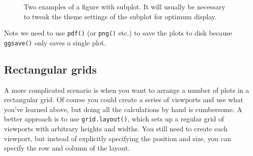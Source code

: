\begin{figure}[htbp]
  \centering
  \caption{Two examples of a figure with subplot. It will usually be necessary to tweak the theme settings of the subplot for optimum display.}
  \label{fig:subplot}
\end{figure}

Note we need to use \texttt{pdf()} (or \texttt{png()} etc.) to save the
plots to disk because \texttt{ggsave()} only saves a single plot.

\subsection{Rectangular grids}

A more complicated scenario is when you want to arrange a number of
plots in a rectangular grid. Of course you could create a series of
viewports and use what you've learned above, but doing all the
calculations by hand is cumbersome. A better approach is to use
\texttt{grid.layout()}, which sets up a regular grid of viewports with
arbitrary heights and widths. You still need to create each viewport,
but instead of explicitly specifying the position and size, you can
specify the row and column of the layout.

